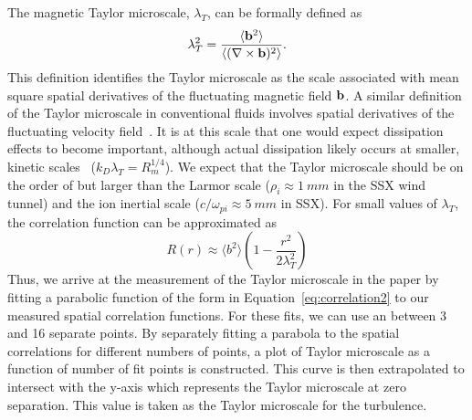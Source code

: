 \documentclass[aip,prl,amsmath,amssymb,reprint,superscriptaddress]{revtex4-1} %
\begin{document}
The magnetic Taylor microscale, $\lambda_{T}$, can be formally defined as
%
\begin{equation}
\lambda_T^2 = \frac{\langle {\bf b}^2 \rangle}{\langle (\nabla \times {\bf b})^2 \rangle}.
\label{eq:tayscale}
\end{equation}
%
This definition identifies the Taylor microscale as the scale associated with mean square spatial derivatives of the fluctuating magnetic field $\bf{b}$. A similar definition of the Taylor microscale in conventional fluids involves spatial derivatives of the fluctuating velocity field~\cite{frisch95}. It is at this scale that one would expect dissipation effects to become important, although actual dissipation likely occurs at smaller, kinetic scales~\cite{Matthaeus08} ($k_D \lambda_T = R_m^{1/4}$).  We expect that the Taylor microscale should be on the order of but larger than the Larmor scale ($\rho_i \approx 1~mm$ in the SSX wind tunnel) and the ion inertial scale ($c/\omega_{pi} \approx 5~mm$ in SSX). For small values of $\lambda_{T}$, the correlation function can be approximated as
%
\begin{equation}
R(r) \approx  \langle b^2 \rangle \left(1 - \frac{r^2}{2 \lambda_T^2}  \right)
\label{eq:correlation2} 
\end{equation}
%
Thus, we arrive at the measurement of the Taylor microscale in the paper by fitting a parabolic function of the form in Equation~\ref{eq:correlation2} to our measured spatial correlation functions. For these fits, we can use an between 3 and 16 separate points. By separately fitting a parabola to the spatial correlations for different numbers of points, a plot of Taylor microscale as a function of number of fit points is constructed. This curve is then extrapolated to intersect with the y-axis which represents the Taylor microscale at zero separation. This value is taken as the Taylor microscale for the turbulence.
\end{document}
